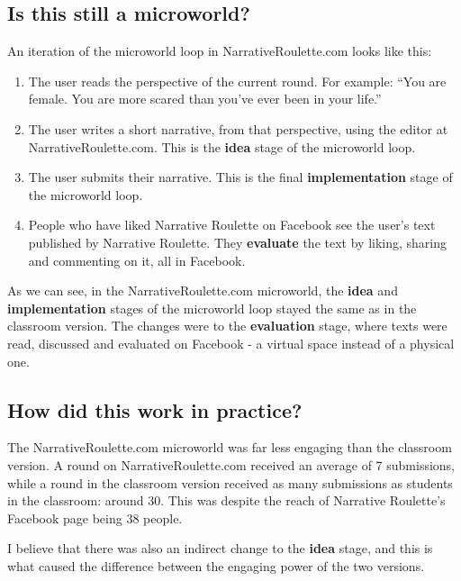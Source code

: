 \subsection{Is this still a microworld?}

An iteration of the microworld loop in NarrativeRoulette.com looks like
this: 

\begin{enumerate}

\item The user reads the perspective of the current round. For
example: ``You are female. You are more scared than you've ever been in
your life.'' 

\item The user writes a short narrative, from that
perspective, using the editor at NarrativeRoulette.com. This is the
\textbf{idea} stage of the microworld loop. 

\item The user submits their
narrative. This is the final \textbf{implementation} stage of the
microworld loop. 

\item People who have liked Narrative Roulette on Facebook
see the user's text published by Narrative Roulette. They
\textbf{evaluate} the text by liking, sharing and commenting on it, all
in Facebook.

\end{enumerate}

As we can see, in the NarrativeRoulette.com microworld, the
\textbf{idea} and \textbf{implementation} stages of the microworld loop
stayed the same as in the classroom version. The changes were to the
\textbf{evaluation} stage, where texts were read, discussed and
evaluated on Facebook - a virtual space instead of a physical one.

\subsection{How did this work in practice?}

The NarrativeRoulette.com microworld was far less engaging than the
classroom version. A round on NarrativeRoulette.com received an average
of 7 submissions, while a round in the classroom version received as
many submissions as students in the classroom: around 30. This was
despite the reach of Narrative Roulette's Facebook page being 38 people.

I believe that there was also an indirect change to the \textbf{idea}
stage, and this is what caused the difference between the engaging power
of the two versions.

